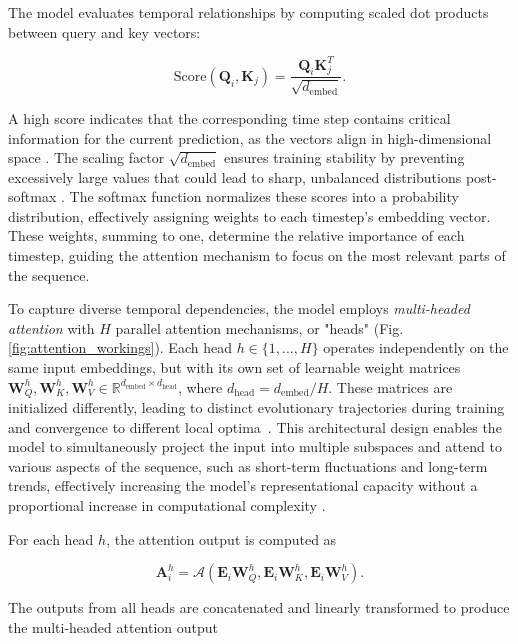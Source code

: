 The model evaluates temporal relationships by computing scaled dot products between query and key vectors:

\begin{equation}
    \text{Score}(\mathbf{Q}_i, \mathbf{K}_j) = \frac{\mathbf{Q}_i \mathbf{K}_j^T}{\sqrt{d_{\text{embed}}}}.
\end{equation}

A high score indicates that the corresponding time step contains critical information for the current prediction, as the vectors align in high-dimensional space \cite{luong2015effective}. The scaling factor $\sqrt{d_{\text{embed}}}$ ensures training stability by preventing excessively large values that could lead to sharp, unbalanced distributions post-softmax \cite{xu2015show}. The softmax function normalizes these scores into a probability distribution, effectively assigning weights to each timestep's embedding vector. These weights, summing to one, determine the relative importance of each timestep, guiding the attention mechanism to focus on the most relevant parts of the sequence.

To capture diverse temporal dependencies, the model employs \textit{multi-headed attention} \cite{michel2019sixteen} with $H$ parallel attention mechanisms, or "heads" (Fig. \ref{fig:attention_workings}). Each head $h \in \{1, ..., H\}$ operates independently on the same input embeddings, but with its own set of learnable weight matrices $\mathbf{W}_Q^h, \mathbf{W}_K^h, \mathbf{W}_V^h \in \mathbb{R}^{d_{\text{embed}} \times d_{\text{head}}}$, where $d_{\text{head}} = d_{\text{embed}} / H$. These matrices are initialized differently, leading to distinct evolutionary trajectories during training and convergence to different local optima~\cite{zhang2019improving}. This architectural design enables the model to simultaneously project the input into multiple subspaces and attend to various aspects of the sequence, such as short-term fluctuations and long-term trends, effectively increasing the model's representational capacity without a proportional increase in computational complexity \cite{vaswani2017attention}.

For each head $h$, the attention output is computed as

\begin{equation}
    \mathbf{A}_i^h = \mathcal{A}(\mathbf{E}_i\mathbf{W}_Q^h, \mathbf{E}_i\mathbf{W}_K^h, \mathbf{E}_i\mathbf{W}_V^h).
\end{equation}

The outputs from all heads are concatenated and linearly transformed to produce the multi-headed attention output

